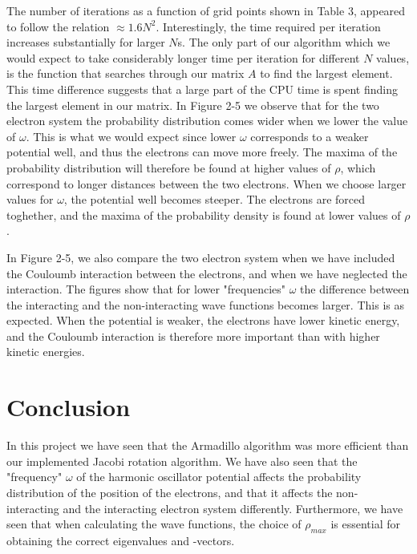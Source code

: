 \documentclass[norsk,a4paper,12pt]{article}
\begin{document}
The number of iterations as a function of grid points shown in Table 3, appeared to follow the relation $\approx 1.6 N^2$. Interestingly, the time required per iteration increases substantially for larger $N$s. The only part of our algorithm which we would expect to take considerably longer time per iteration for different $N$ values, is the function that searches through our matrix $A$ to find the largest element. This time difference suggests that a large part of the CPU time is spent finding the largest element in our matrix. 
\vspace{1mm}
In Figure 2-5 we observe that for the two electron system the probability distribution comes wider when we lower the value of $\omega$. This is what we would expect since lower $\omega$ corresponds to a weaker potential well, and thus the electrons can move more freely. The maxima of the probability distribution will therefore be found at higher values of $\rho$, which correspond to longer distances between the two electrons. When we choose larger values for $\omega$, the potential well becomes steeper. The electrons are forced toghether, and the maxima of the probability density is found at lower values of $\rho$.
\par
\vspace{2mm}
In Figure 2-5, we also compare the two electron system when we have included the Couloumb interaction between the electrons, and when we have neglected the interaction. The figures show that for lower "frequencies" $\omega$ the difference between the interacting and the non-interacting wave functions becomes larger. This is as expected. When the potential is weaker, the electrons have lower kinetic energy, and the Couloumb interaction is therefore more important than with higher kinetic energies.
\par
\vspace{3mm}



\section{Conclusion}
In this project we have seen that the Armadillo algorithm was more efficient than our implemented Jacobi rotation algorithm.  We have also seen that the "frequency" $\omega$ of the harmonic oscillator potential affects the probability distribution of the position of the electrons, and that it affects the non-interacting and the interacting electron system differently. Furthermore, we have seen that when calculating the wave functions, the choice of $\rho_{max}$ is essential for obtaining the correct eigenvalues and -vectors.
\end{document}

